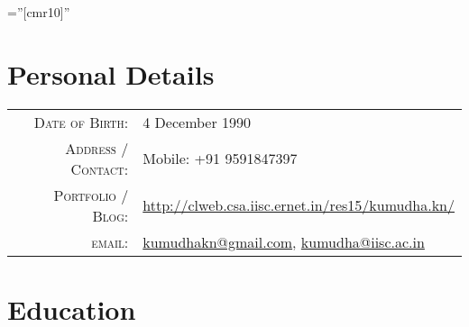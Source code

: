 \documentclass[a4paper,10pt]{article} %
\begin{document}
\pagestyle{empty} %

\font\fb=''[cmr10]'' %


\par{\bigskip\par} %

\section{Personal Details}

\begin{tabular}{rl}
\textsc{Date of Birth:} & 4 December 1990 \\
\textsc{Address / Contact:} & Mobile: +91 9591847397 \\
\textsc{Portfolio / Blog:} & \href{http://clweb.csa.iisc.ernet.in/res15/kumudha.kn/}{http://clweb.csa.iisc.ernet.in/res15/kumudha.kn/}\\
\textsc{email:} & \href{mailto:kumudhakn@gmail.com}{kumudhakn@gmail.com}, \href{mailto:kumudha@iisc.ac.in}{kumudha@iisc.ac.in}
\end{tabular}


\section{Education}
\end{document}
